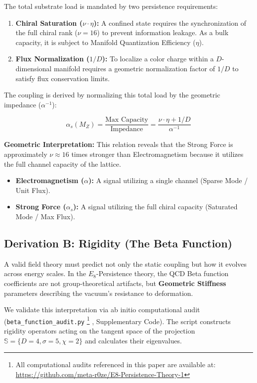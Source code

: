 The total substrate load is mandated by two persistence requirements:
\begin{enumerate}
    \item \textbf{Chiral Saturation ($\nu \cdot \eta$):} A confined state requires the synchronization of the full chiral rank ($\nu=16$) to prevent information leakage. As a bulk capacity, it is subject to Manifold  Quantization Efficiency ($\eta$).
    \item \textbf{Flux Normalization ($1/D$):} To localize a color charge within a $D$-dimensional manifold requires a geometric normalization factor of $1/D$ to satisfy flux conservation limits.
\end{enumerate}

The coupling is derived by normalizing this total load by the geometric impedance ($\alpha^{-1}$):

\begin{equation} \label{eq:alphas_saturation}
\alpha_s(M_Z) = \frac{\text{Max Capacity}}{\text{Impedance}} 
= \frac{\nu \cdot \eta + 1/D}{\alpha^{-1}}
\end{equation}

\textbf{Geometric Interpretation:} This relation reveals that the Strong Force is approximately $\nu \approx 16$ times stronger than Electromagnetism because it utilizes the full channel capacity of the lattice.
\begin{itemize}
    \item \textbf{Electromagnetism ($\alpha$):} A signal utilizing a single channel (Sparse Mode / Unit Flux).
    \item \textbf{Strong Force ($\alpha_s$):} A signal utilizing the full chiral capacity (Saturated Mode / Max Flux).
\end{itemize}


\subsection{Derivation B: Rigidity (The Beta Function)}

A valid field theory must predict not only the static coupling but how it evolves across energy scales. In the $E_8$-Persistence theory, the QCD Beta function coefficients are not group-theoretical artifacts, but \textbf{Geometric Stiffness} parameters describing the vacuum's resistance to deformation.

We validate this interpretation via ab initio computational audit (\texttt{beta\_function\_audit.py}
\footnote{All computational audits referenced in this paper are available at: \url{https://github.com/meta-r0ze/E8-Persistence-Theory-1}}
, Supplementary Code). The script constructs rigidity operators acting on the tangent space of the projection $\mathbb{S} = \{D=4, \sigma=5, \chi=2\}$ and calculates their eigenvalues.
